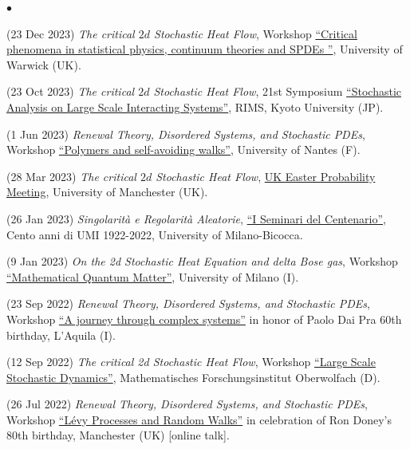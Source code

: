 \documentclass[a4paper,11pt,oneside]{amsart}
\newenvironment{myitemize}{%
\begin{list}{$\bullet$}%
 	{%
	\setlength{\itemsep}{0.3em}%
	\setlength{\topsep}{0.3em}%
	\setlength{\partopsep}{0em}%
	\setlength{\parsep}{0em}%
	\setlength{\parskip}{0em}%
	\setlength\leftmargin{1.5em}%
	\setlength\labelwidth{1.1em}%
	\setlength{\labelsep}{0.4em}%
	}%
	}%
{\end{list}}
\renewenvironment{itemize}{
\begin{myitemize}}%
{\end{myitemize}}
\begin{document}
\begin{itemize}
\item (23 Dec 2023)
\emph{The critical $2d$ Stochastic Heat Flow},
Workshop \href{https://warwick.ac.uk/fac/sci/statistics/news/criticality_workshop}{``Critical phenomena 
in statistical physics, continuum theories and SPDEs ''},
University of Warwick (UK).

\item (23 Oct 2023)
\emph{The critical $2d$ Stochastic Heat Flow},
21st Symposium \href{https://sites.google.com/view/workshop-salsis/home/2023}{``Stochastic 
Analysis on Large Scale Interacting Systems''},
RIMS, Kyoto University (JP).

\item (1 Jun 2023)
\emph{Renewal Theory, Disordered Systems, and Stochastic PDEs},
Workshop \href{https://www.lebesgue.fr/en/polywalks/programme}{``Polymers and self-avoiding walks''}, 
University of Nantes (F).

\item (28 Mar 2023)
\emph{The critical $2d$ Stochastic Heat Flow},
\href{https://personalpages.manchester.ac.uk/staff/xiong.jin/easter23/index.html}{UK Easter 
Probability Meeting},
University of Manchester (UK).

\item (26 Jan 2023)
\emph{Singolarità e Regolarità Aleatorie},
\href{https://umi.dm.unibo.it/milano26gennaio23/}{``I Seminari del Centenario''}, 
Cento anni di UMI 1922-2022, 
 University of Milano-Bicocca.

\item (9 Jan 2023)
\emph{On the 2d Stochastic Heat Equation and delta Bose gas},
Workshop \href{https://sites.google.com/view/mqm-workshop-2023/}{``Mathematical Quantum Matter''},
University of Milano (I).

\item (23 Sep 2022)
\emph{Renewal Theory, Disordered Systems, and Stochastic PDEs},
Workshop \href{https://sites.google.com/view/pdp60laquila/}{``A journey through complex systems''}
in honor of Paolo Dai Pra 60th birthday, L'Aquila (I).

\item (12 Sep 2022)
\emph{The critical 2d Stochastic Heat Flow},
Workshop  \href{https://www.mfo.de/occasion/2237/www_view}{``Large Scale Stochastic Dynamics''},
Mathematisches Forschungsinstitut Oberwolfach (D).

\item (26 Jul 2022)
\emph{Renewal Theory, Disordered Systems, and Stochastic PDEs},
Workshop 
\href{https://personalpages.manchester.ac.uk/staff/denis.denisov/LevyRW-workshop/index.html}{``Lévy 
Processes and Random Walks''}
in celebration of Ron Doney's 80th birthday,
Manchester (UK) [online talk].


\end{itemize}
\end{document}
